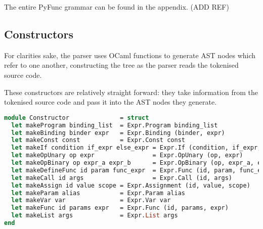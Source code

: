 \documentclass{l4proj}
\begin{document}
The entire PyFunc grammar can be found in the appendix. (ADD REF)

\subsection{Constructors}

For clarities sake, the parser uses OCaml functions to generate AST nodes which refer to one another, constructing the tree as the parser reads the tokenised source code.

These constructors are relatively straight forward: they take information from the tokenised source code and pass it into the AST nodes they generate.

\begin{lstlisting}[language=Caml, keepspaces=true, caption=PyFunc frontend AST constructor functions.]
module Constructor              = struct
  let makeProgram binding_list  = Expr.Program binding_list
  let makeBinding binder expr   = Expr.Binding (binder, expr)
  let makeConst const           = Expr.Const const
  let makeIf condition if_expr else_expr = Expr.If (condition, if_expr, else_expr)
  let makeOpUnary op expr                = Expr.OpUnary (op, expr)
  let makeOpBinary op expr_a expr_b      = Expr.OpBinary (op, expr_a, expr_b)
  let makeDefineFunc id param func_expr  = Expr.Func (id, param, func_expr)
  let makeCall id args                   = Expr.Call (id, args)
  let makeAssign id value scope = Expr.Assignment (id, value, scope)
  let makeParam alias           = Expr.Param alias
  let makeVar var               = Expr.Var var
  let makeFunc id params expr   = Expr.Func (id, params, expr)
  let makeList args             = Expr.List args
end
\end{lstlisting}






\end{document}

